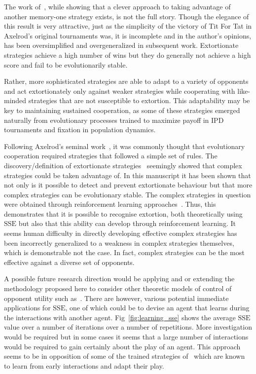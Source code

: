 \documentclass[10pt,letterpaper]{article}
\newcommand{\SSe}{\text{SSE}}
\begin{document}
The work of~\cite{Press2012}, while showing that a clever approach to taking
advantage of another memory-one strategy exists, is not the full story.
Though the elegance of this result is very attractive, just as the simplicity of
the victory of Tit For Tat in Axelrod's original tournaments was, it is
incomplete and in the author's opinions, has been oversimplified and
overgeneralized in subsequent work. Extortionate strategies achieve a high
number of wins but they do generally not achieve a high score and fail to be
evolutionarily stable.

Rather, more sophisticated strategies are able to adapt to a variety of opponents
and act extortionately only against weaker strategies while cooperating with
like-minded strategies that are not susceptible to extortion. This adaptability
may be key to maintaining sustained cooperation, as some of these strategies
emerged naturally from evolutionary processes trained to maximize payoff in
IPD tournaments and fixation in population dynamics.

Following Axelrod's seminal work~\cite{Axelrod1980, Axelrod1980a}, it was
commonly thought that evolutionary cooperation required strategies that followed
a simple set of rules. The discovery/definition of extortionate
strategies~\cite{Press2012} seemingly showed that complex strategies could be
taken advantage of. In this manuscript it has been shown that not only is it
possible to detect and prevent extortionate behaviour but that more complex
strategies can be evolutionary stable. The complex strategies in question were
obtained through reinforcement learning approaches~\cite{Harper2017, Moran1707}.
Thus, this demonstrates that it is possible to recognise extortion, both
theoretically using \(\SSe\) but also that this ability can develop through
reinforcement learning. It seems human difficulty in directly developing
effective complex strategies has been incorrectly generalized to a weakness
in complex strategies themselves, which is demonstrable not the case. In fact,
complex strategies can be the most effective against a diverse set of opponents.


A possible future research direction would be applying and or extending the
methodology proposed here to consider other theoretic models of control of
opponent utility such as~\cite{Akin2015, hao2018, chen2022}. There are however,
various potential immediate applications for \(\SSe\), one of which could be to
devise an agent that learns during the interactions with another agent.
Fig~\ref{fig:learning_sse} shows the average \(\SSe\) value over a number of
iterations over a number of repetitions. More investigation would be required
but in some cases it seems that a large number of interactions would be required
to gain certainly about the play of an agent. This approach seems to be in
opposition of some of the trained strategies of~\cite{Harper2017} which are
known to learn from early interactions and adapt their play.
\end{document}
